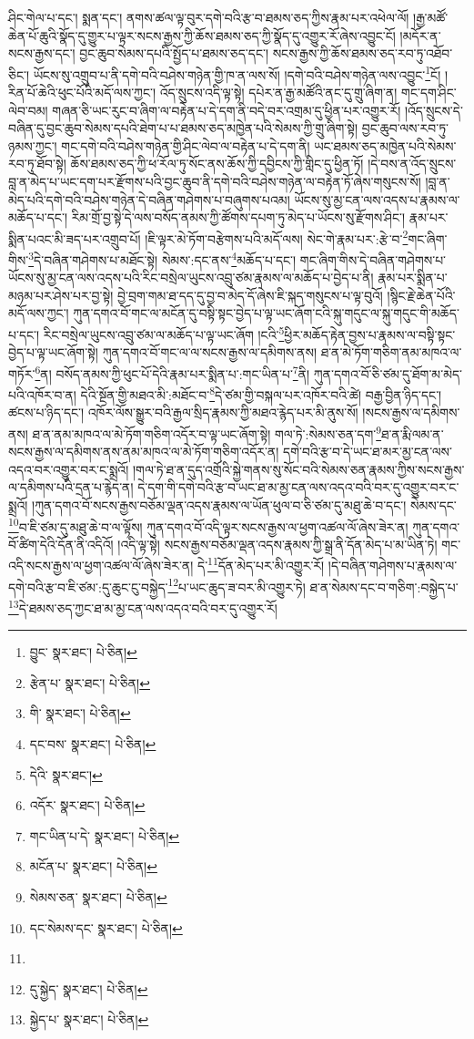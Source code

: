 ཤིང་གེལ་པ་དང་། སྨན་དང་། ནགས་ཚལ་ལྟ་བུར་དགེ་བའི་རྩ་བ་ཐམས་ཅད་ཀྱིས་རྣམ་པར་འཕེལ་ལོ། །རྒྱ་མཚོ་ཆེན་པོ་ཆུའི་སྣོད་དུ་གྱུར་པ་ལྟར་སངས་རྒྱས་ཀྱི་ཆོས་ཐམས་ཅད་ཀྱི་སྣོད་དུ་འགྱུར་རོ་ཞེས་འབྱུང་ངོ། །མདོར་ན་སངས་རྒྱས་དང་། བྱང་ཆུབ་སེམས་དཔའི་སྤྱོད་པ་ཐམས་ཅད་དང་། སངས་རྒྱས་ཀྱི་ཆོས་ཐམས་ཅད་རབ་ཏུ་འཐོབ་ཅིང་། ཡོངས་སུ་འགྲུབ་པ་ནི་དགེ་བའི་བཤེས་གཉེན་གྱི་ཁ་ན་ལས་སོ། །དགེ་བའི་བཤེས་གཉེན་ལས་འབྱུང་\footnote{བྱུང་  སྣར་ཐང་།  པེ་ཅིན། }ངོ། །རིན་པོ་ཆེའི་ཕུང་པོའི་མདོ་ལས་ཀྱང་། འོད་སྲུངས་འདི་ལྟ་སྟེ། དཔེར་ན་རྒྱ་མཚོའི་ནང་དུ་གྲུ་ཞིག་ན། གང་དག་ཤིང་ལེབ་བམ། གཞན་ཅི་ཡང་རུང་བ་ཞིག་ལ་བརྟེན་པ་དེ་དག་ནི་བདེ་བར་འགྲམ་དུ་ཕྱིན་པར་འགྱུར་རོ། །འོད་སྲུངས་དེ་བཞིན་དུ་བྱང་ཆུབ་སེམས་དཔའི་ཐེག་པ་པ་ཐམས་ཅད་མཁྱེན་པའི་སེམས་ཀྱི་གྲུ་ཞིག་སྟེ། བྱང་ཆུབ་ལས་རབ་ཏུ་ཉམས་ཀྱང་། གང་དགེ་བའི་བཤེས་གཉེན་གྱི་ཤིང་ལེབ་ལ་བརྟེན་པ་དེ་དག་ནི། ཡང་ཐམས་ཅད་མཁྱེན་པའི་སེམས་རབ་ཏུ་ཐོབ་སྟེ། ཆོས་ཐམས་ཅད་ཀྱི་ཕ་རོལ་ཏུ་སོང་ནས་ཆོས་ཀྱི་དབྱིངས་ཀྱི་གླིང་དུ་ཕྱིན་ཏོ། །དེ་བས་ན་འོད་སྲུངས་བླ་ན་མེད་པ་ཡང་དག་པར་རྫོགས་པའི་བྱང་ཆུབ་ནི་དགེ་བའི་བཤེས་གཉེན་ལ་བརྟེན་ཏོ་ཞེས་གསུངས་སོ། །བླ་ན་མེད་པའི་དགེ་བའི་བཤེས་གཉེན་དེ་བཞིན་གཤེགས་པ་བཞུགས་པའམ། ཡོངས་སུ་མྱ་ངན་ལས་འདས་པ་རྣམས་ལ་མཆོད་པ་དང་། རིམ་གྲོ་བྱ་སྟེ་དེ་ལས་བསོད་ནམས་ཀྱི་ཚོགས་དཔག་ཏུ་མེད་པ་ཡོངས་སུ་རྫོགས་ཤིང་། རྣམ་པར་སྨིན་པའང་མི་ཟད་པར་འགྲུབ་པོ། །ཇི་ལྟར་མེ་ཏོག་བརྩེགས་པའི་མདོ་ལས། སེང་གེ་རྣམ་པར་:རྩེ་བ་\footnote{རྩེན་པ་  སྣར་ཐང་།  པེ་ཅིན། }གང་ཞིག་གིས་\footnote{གི་  སྣར་ཐང་།  པེ་ཅིན། }དེ་བཞིན་གཤེགས་པ་མཐོང་སྟེ། སེམས་:དང་ནས་\footnote{དང་བས་  སྣར་ཐང་།  པེ་ཅིན། }མཆོད་པ་དང་། གང་ཞིག་གིས་དེ་བཞིན་གཤེགས་པ་ཡོངས་སུ་མྱ་ངན་ལས་འདས་པའི་རིང་བསྲེལ་ཡུངས་འབྲུ་ཙམ་རྣམས་ལ་མཆོད་པ་བྱེད་པ་ནི། རྣམ་པར་སྨིན་པ་མཉམ་པར་ཤེས་པར་བྱ་སྟེ། བྱེ་བྲག་གམ་ཐ་དད་དུ་བྱ་བ་མེད་དོ་ཞེས་ཇི་སྐད་གསུངས་པ་ལྟ་བུའོ། །སྙིང་རྗེ་ཆེན་པོའི་མདོ་ལས་ཀྱང་། ཀུན་དགའ་བོ་གང་ལ་མངོན་དུ་བསྟི་སྟང་བྱེད་པ་ལྟ་ཡང་ཞོག་ངའི་སྐུ་གདུང་ལ་སྐུ་གདུང་གི་མཆོད་པ་དང་། རིང་བསྲེལ་ཡུངས་འབྲུ་ཙམ་ལ་མཆོད་པ་ལྟ་ཡང་ཞོག །ངའི་\footnote{དེའི་  སྣར་ཐང་། }ཕྱིར་མཆོད་རྟེན་བྱས་པ་རྣམས་ལ་བསྟི་སྟང་བྱེད་པ་ལྟ་ཡང་ཞོག་སྟེ། ཀུན་དགའ་བོ་གང་ལ་ལ་སངས་རྒྱས་ལ་དམིགས་ནས། ཐ་ན་མེ་ཏོག་གཅིག་ནམ་མཁའ་ལ་གཏོར་\footnote{འདོར་  སྣར་ཐང་།  པེ་ཅིན། }ན། བསོད་ནམས་ཀྱི་ཕུང་པོ་དེའི་རྣམ་པར་སྨིན་པ་:གང་ཡིན་པ་\footnote{གང་ཡིན་པ་དེ་  སྣར་ཐང་།  པེ་ཅིན། }ནི། ཀུན་དགའ་བོ་ཅི་ཙམ་དུ་ཐོག་མ་མེད་པའི་འཁོར་བ་ན། དེའི་སྔོན་གྱི་མཐའ་མི་:མཐོང་བ་\footnote{མངོན་པ་  སྣར་ཐང་།  པེ་ཅིན། }དེ་ཙམ་གྱི་བསྐལ་པར་འཁོར་བའི་ཚེ། བརྒྱ་བྱིན་ཉིད་དང་། ཚངས་པ་ཉིད་དང་། འཁོར་ལོས་སྒྱུར་བའི་རྒྱལ་སྲིད་རྣམས་ཀྱི་མཐའ་རྙེད་པར་མི་ནུས་སོ། །སངས་རྒྱས་ལ་དམིགས་ནས། ཐ་ན་ནམ་མཁའ་ལ་མེ་ཏོག་གཅིག་འདོར་བ་ལྟ་ཡང་ཞོག་སྟེ། གལ་ཏེ་:སེམས་ཅན་དག་\footnote{སེམས་ཅན་  སྣར་ཐང་།  པེ་ཅིན། }ཐ་ན་རྨི་ལམ་ན་སངས་རྒྱས་ལ་དམིགས་ནས་ནམ་མཁའ་ལ་མེ་ཏོག་གཅིག་འདོར་ན། དགེ་བའི་རྩ་བ་དེ་ཡང་ཐ་མར་མྱ་ངན་ལས་འདའ་བར་འགྱུར་བར་ང་སྨྲའོ། །གལ་ཏེ་ཐ་ན་དུད་འགྲོའི་སྐྱེ་གནས་སུ་སོང་བའི་སེམས་ཅན་རྣམས་ཀྱིས་སངས་རྒྱས་ལ་དམིགས་པའི་དྲན་པ་རྙེད་ན། དེ་དག་གི་དགེ་བའི་རྩ་བ་ཡང་ཐ་མ་མྱ་ངན་ལས་འདའ་བའི་བར་དུ་འགྱུར་བར་ང་སྨྲའོ། །ཀུན་དགའ་བོ་སངས་རྒྱས་བཅོམ་ལྡན་འདས་རྣམས་ལ་ཡོན་ཕུལ་བ་ཅི་ཙམ་དུ་མཐུ་ཆེ་བ་དང་། སེམས་དང་\footnote{དང་སེམས་དང་  སྣར་ཐང་།  པེ་ཅིན། }བ་ཇི་ཙམ་དུ་མཐུ་ཆེ་བ་ལ་ལྟོས། ཀུན་དགའ་བོ་འདི་ལྟར་སངས་རྒྱས་ལ་ཕྱག་འཚལ་ལོ་ཞེས་ཟེར་ན། ཀུན་དགའ་བོ་ཚིག་དེའི་དོན་ནི་འདིའོ། །འདི་ལྟ་སྟེ། སངས་རྒྱས་བཅོམ་ལྡན་འདས་རྣམས་ཀྱི་སྒྲ་ནི་དོན་མེད་པ་མ་ཡིན་ཏེ། གང་འདི་སངས་རྒྱས་ལ་ཕྱག་འཚལ་ལོ་ཞེས་ཟེར་ན། དེ་\footnote{}དོན་མེད་པར་མི་འགྱུར་རོ། །དེ་བཞིན་གཤེགས་པ་རྣམས་ལ་དགེ་བའི་རྩ་བ་ཇི་ཙམ་:དུ་ཆུང་ངུ་བསྐྱེད་\footnote{དུ་སྐྱེད་  སྣར་ཐང་།  པེ་ཅིན། }པ་ཡང་ཆུད་ཟ་བར་མི་འགྱུར་ཏེ། ཐ་ན་སེམས་དང་བ་གཅིག་:བསྐྱེད་པ་\footnote{སྐྱེད་པ་  སྣར་ཐང་།  པེ་ཅིན། }དེ་ཐམས་ཅད་ཀྱང་ཐ་མ་མྱ་ངན་ལས་འདའ་བའི་བར་དུ་འགྱུར་རོ། 